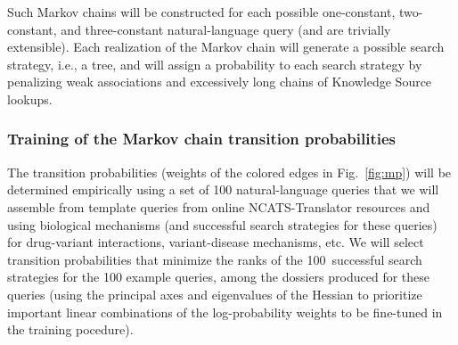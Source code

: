 \documentclass[11pt,notitlepage]{article}
\begin{document}
Such Markov chains will be constructed for each possible one-constant, two-constant,
and three-constant natural-language query (and are trivially extensible). 
 Each realization of the Markov chain will generate a possible search strategy,
 i.e., a tree,
and will assign a probability to each search strategy by penalizing weak associations and excessively long chains
of Knowledge Source lookups.

\subsubsection{Training of the Markov chain transition probabilities}
The transition probabilities (weights of the
colored edges in Fig.~\ref{fig:mp}) will be determined empirically using a set
of 100 natural-language queries that we will assemble from template queries from
online NCATS-Translator resources and using biological mechanisms (and
successful search strategies for these queries)
for drug-variant interactions, variant-disease mechanisms, etc. We will select
transition probabilities that minimize the ranks of the 100~successful search
strategies for the 100 example queries, among the dossiers produced for these
queries (using the principal axes and eigenvalues of the Hessian to
prioritize important linear combinations of the log-probability weights to
be fine-tuned in the training pocedure).
\end{document}
